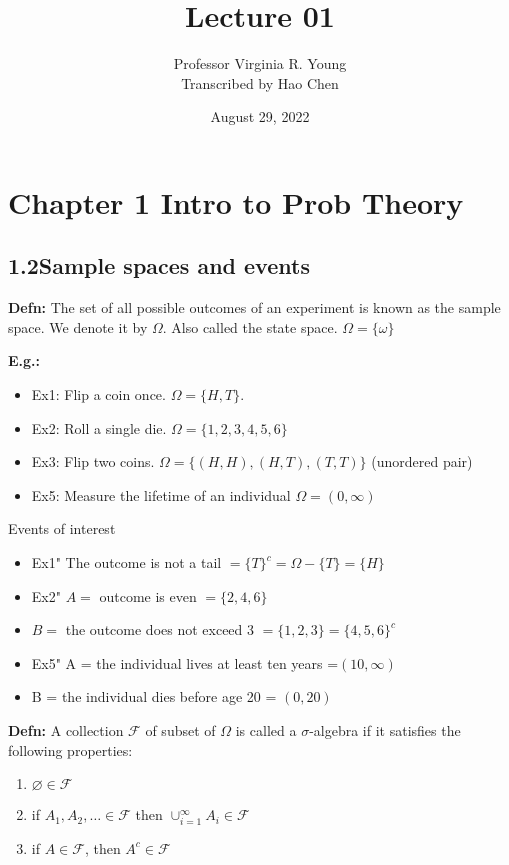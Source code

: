 \documentclass[a4paper]{article}
\title{Lecture 01}
\author{Professor Virginia R. Young\\ \small{Transcribed by Hao Chen}}
\date{August 29, 2022}
\newcommand{\n}{\hfill\break}
\newcommand{\defn}[1]{\par\noindent\settowidth{\hangindent}{\textbf{Defn: }}\textbf{Defn: }#1\n}
\newcommand{\eg}[1]{\par\noindent\settowidth{\hangindent}{\textbf{E.g.: }}\textbf{E.g.: }#1\n}
\newcommand{\F}{\mathcal F}
\begin{document}
\maketitle
\section*{Chapter 1 Intro to Prob Theory}
\subsection*{1.2\;\;Sample spaces and events}

\defn{The set of all possible outcomes of an experiment is known as the sample space. We denote it by $\Omega$. Also called the state space. $\Omega=\{\omega\}$}
\eg{\begin{itemize}
    \item Ex1: Flip a coin once. $\Omega=\{H, T\}$.
    \item Ex2: Roll a single die. $\Omega=\{1, 2, 3, 4, 5, 6\}$
    \item Ex3: Flip two coins. $\Omega=\{(H, H), (H, T), (T, T)\}$ (unordered pair)
    \item Ex5: Measure the lifetime of an individual $\Omega=(0, \infty)$
\end{itemize}
Events of interest
\begin{itemize}
    \item Ex1" The outcome is not a tail $=\{T\}^c=\Omega-\{T\}=\{H\}$
    \item Ex2" $A=$ outcome is even $=\{2, 4, 6\}$
    \item $B=$ the outcome does not exceed 3 $= \{1, 2, 3\} = \{4, 5, 6\}^c$
    \item Ex5" A = the individual lives at least ten years =$(10, \infty)$
    \item B = the individual dies before age 20 = $(0, 20)$
\end{itemize}
}

\defn{A collection $\F$ of subset of $\Omega$ is called a $\sigma$-algebra if it satisfies the following properties:\\
\begin{enumerate}
    \item $\varnothing\in \F$
    \item if $A_1, A_2, \dots\in \F$ then $\cup^\infty_{i=1}A_i\in \F$
    \item if $A\in \F$, then $A^c\in \F$
\end{enumerate}
}
\end{document}
